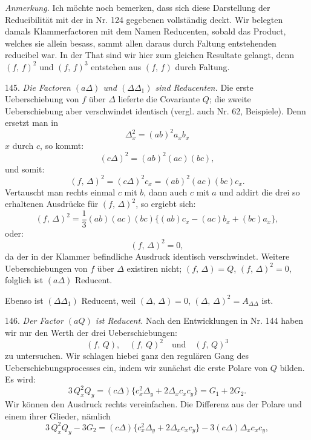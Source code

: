 \documentclass[11pt]{article}
\providecommand{\weq}[2]{\begin{equation}\tag{#1}#2\end{equation}}
\let\Delta\varDelta
\begin{document}
\textit{Anmerkung.} Ich möchte noch bemerken, dass sich diese Darstellung der Reducibilität mit der in Nr. 124 gegebenen vollständig deckt. Wir belegten damals Klammerfactoren mit dem Namen Reducenten, sobald das Product, welches sie allein besass, sammt allen daraus durch Faltung entstehenden reducibel war. In der That sind wir hier zum gleichen Resultate gelangt, denn $(f,\,f)^2$ und $(f,\,f)^{3}$ entstehen aus $(f,\,f)$ durch Faltung.

145. \textit{Die Factoren $(a\Delta)$ und $(\Delta\Delta_1)$ sind Reducenten.} Die erste Ueberschiebung von $f$ über $\Delta$ lieferte die Covariante $Q$; die zweite Ueberschiebung aber verschwindet identisch (vergl. auch Nr. 62, Beispiele). Denn ersetzt man in
\[
\Delta_x^2 = (ab)^2 a_x b_x
\]
$x$ durch $c$, so kommt:
\[
(c\Delta)^2 = (ab)^2 (ac)(bc),
\]
und somit:
\[
(f,\,\Delta)^2 = (c\Delta)^2 c_x = (ab)^2 (ac)(bc) c_x.
\]
Vertauscht man rechts einmal $c$ mit $b$, dann auch $c$ mit $a$ und addirt die drei so erhaltenen Ausdrücke für $(f,\,\Delta)^2$, so ergiebt sich:
\[
(f,\,\Delta)^2 = \frac{1}{3}(ab)(ac)(bc)\{(ab)c_x - (ac)b_x + (bc)a_x\},
\]
oder:
\weq{I}{(f,\,\Delta)^2 = 0,}
da der in der Klammer befindliche Ausdruck identisch verschwindet. Weitere Ueberschiebungen von $f$ über $\Delta$ existiren nicht; $(f,\,\Delta) = Q$, $(f,\,\Delta)^2 = 0$, folglich ist $(a\Delta)$ Reducent.

Ebenso ist $(\Delta\Delta_1)$ Reducent, weil $(\Delta,\,\Delta) = 0$, $(\Delta,\,\Delta)^2 = A_{\Delta\Delta}$ ist.

146. \textit{Der Factor $(aQ)$ ist Reducent.} Nach den Entwicklungen in Nr. 144 haben wir nur den Werth der drei Ueberschiebungen:
\[
(f,\,Q), \quad (f,\,Q)^2 \quad \text{und} \quad (f,\,Q)^3
\]
zu untersuchen. Wir schlagen hiebei ganz den regulären Gang des Ueberschiebungsprocesses ein, indem wir zunächst die erste Polare von $Q$ bilden. Es wird:
\weq{1}{3\,Q_x^2 Q_y = (c\Delta)\{c_x^2 \Delta_y + 2\Delta_x c_x c_y\} = G_1 + 2G_2.}
Wir können den Ausdruck rechts vereinfachen. Die Differenz aus der Polare und einem ihrer Glieder, nämlich
\[
3\,Q_x^2 Q_y - 3G_2 = (c\Delta)\{c_x^2 \Delta_y + 2\Delta_x c_x c_y\} - 3(c\Delta)\Delta_x c_x c_y,
\]
\end{document}

